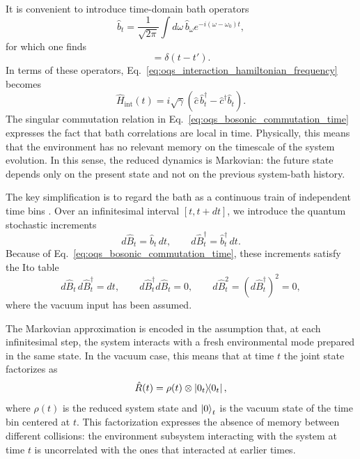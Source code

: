 It is convenient to introduce time-domain bath operators
\begin{equation}
	\hat b_t
	=
	\frac{1}{\sqrt{2\pi}}
	\int d\omega\,
	\hat b_\omega e^{-i(\omega-\omega_0)t},
	\label{eq:oqs_time_domain_bath_operator}
\end{equation}
for which one finds
\begin{equation}
	[\hat b_t,\hat b_{t'}^\dagger]=\delta(t-t').
	\label{eq:oqs_bosonic_commutation_time}
\end{equation}
In terms of these operators, Eq.~\eqref{eq:oqs_interaction_hamiltonian_frequency} becomes
\begin{equation}
	\hat H_{\mathrm{int}}(t)
	=
	i\sqrt{\gamma}
	\left(
	\hat c\, \hat b_t^\dagger - \hat c^\dagger \hat b_t
	\right).
	\label{eq:oqs_interaction_hamiltonian_time}
\end{equation}
The singular commutation relation in Eq.~\eqref{eq:oqs_bosonic_commutation_time} expresses the fact that bath correlations are local in time. Physically, this means that the environment has no relevant memory on the timescale of the system evolution. In this sense, the reduced dynamics is Markovian: the future state depends only on the present state and not on the previous system-bath history.

The key simplification is to regard the bath as a continuous train of independent time bins \cite{Cic17, CicLorGioPal22}. Over an infinitesimal interval $[t,t+dt]$, we introduce the quantum stochastic increments \cite{Par92}
\begin{equation}
	d\hat B_t=\hat b_t\,dt,
	\qquad
	d\hat B_t^\dagger=\hat b_t^\dagger\,dt.
	\label{eq:oqs_quantum_increments}
\end{equation}
Because of Eq.~\eqref{eq:oqs_bosonic_commutation_time}, these increments satisfy the Ito table
\begin{equation}
	d\hat B_t\, d\hat B_t^\dagger = dt,
	\qquad
	d\hat B_t^\dagger d\hat B_t = 0,
	\qquad
	d\hat B_t^2=(d\hat B_t^\dagger)^2=0,
	\label{eq:oqs_ito_table_vacuum}
\end{equation}
where the vacuum input has been assumed.

The Markovian approximation is encoded in the assumption that, at each infinitesimal step, the system interacts with a fresh environmental mode prepared in the same state. In the vacuum case, this means that at time $t$ the joint state factorizes as
\begin{equation}
	\hat R(t)=\rho(t)\otimes \dyad{0_t}{0_t},
	\label{eq:oqs_factorized_state}
\end{equation}
where $\rho(t)$ is the reduced system state and $\ket{0}_t$ is the vacuum state of the time bin centered at $t$. This factorization expresses the absence of memory between different collisions: the environment subsystem interacting with the system at time $t$ is uncorrelated with the ones that interacted at earlier times.

